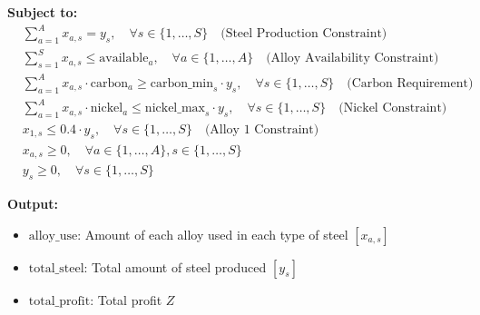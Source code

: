 \documentclass{article}
\begin{document}
\textbf{Subject to:}
\begin{align*}
    & \sum_{a=1}^{A} x_{a,s} = y_{s}, \quad \forall s \in \{1, \ldots, S\} \quad \text{(Steel Production Constraint)} \\
    & \sum_{s=1}^{S} x_{a,s} \leq \text{available}_{a}, \quad \forall a \in \{1, \ldots, A\} \quad \text{(Alloy Availability Constraint)} \\
    & \sum_{a=1}^{A} x_{a,s} \cdot \text{carbon}_{a} \geq \text{carbon\_min}_{s} \cdot y_{s}, \quad \forall s \in \{1, \ldots, S\} \quad \text{(Carbon Requirement)} \\
    & \sum_{a=1}^{A} x_{a,s} \cdot \text{nickel}_{a} \leq \text{nickel\_max}_{s} \cdot y_{s}, \quad \forall s \in \{1, \ldots, S\} \quad \text{(Nickel Constraint)} \\
    & x_{1,s} \leq 0.4 \cdot y_{s}, \quad \forall s \in \{1, \ldots, S\} \quad \text{(Alloy 1 Constraint)} \\
    & x_{a,s} \geq 0, \quad \forall a \in \{1, \ldots, A\}, s \in \{1, \ldots, S\} \\
    & y_{s} \geq 0, \quad \forall s \in \{1, \ldots, S\}
\end{align*}

\textbf{Output:}
\begin{itemize}
    \item \( \text{alloy\_use} \): Amount of each alloy used in each type of steel \( [x_{a,s}] \)
    \item \( \text{total\_steel} \): Total amount of steel produced \( [y_{s}] \)
    \item \( \text{total\_profit} \): Total profit \( Z \)
\end{itemize}
\end{document}
